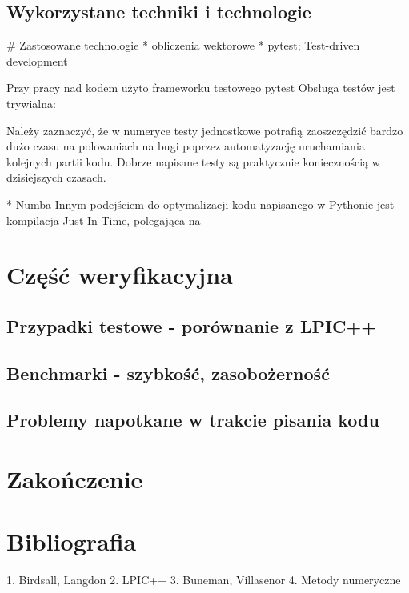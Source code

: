 \subsection{Wykorzystane techniki i technologie}
# Zastosowane technologie
* obliczenia wektorowe
* pytest; Test-driven development

Przy pracy nad kodem użyto frameworku testowego pytest %
Obsługa testów jest trywialna:

Należy zaznaczyć, że w numeryce testy jednostkowe potrafią zaoszczędzić bardzo dużo czasu na polowaniach na bugi
poprzez automatyzację uruchamiania kolejnych partii kodu. Dobrze napisane testy są praktycznie koniecznością w dzisiejszych
czasach. %

* Numba
Innym podejściem do optymalizacji kodu napisanego w Pythonie jest kompilacja Just-In-Time, polegająca na %


\section{Część weryfikacyjna} %
\subsection{Przypadki testowe - porównanie z LPIC++}
\subsection{Benchmarki - szybkość, zasobożerność} %
\subsection{Problemy napotkane w trakcie pisania kodu}
\section{Zakończenie} %
\section{Bibliografia} %
1. Birdsall, Langdon
2. LPIC++
3. Buneman, Villasenor
4. Metody numeryczne


